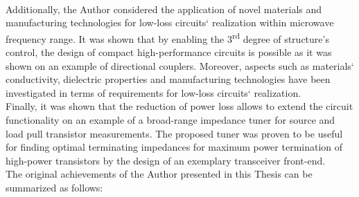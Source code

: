\\
\indent Additionally, the Author considered the application of novel materials and manufacturing technologies for low-loss circuits` realization within microwave frequency range. It was shown that by enabling the 3\textsuperscript{rd} degree of structure's control, the design of compact high-performance circuits is possible as it was shown on an example of directional couplers. Moreover, aspects such as materials` conductivity, dielectric properties and manufacturing technologies have been investigated in terms of requirements for low-loss circuits` realization.
\\
\indent Finally, it was shown that the reduction of power loss allows to extend the circuit functionality on an example of a broad-range impedance tuner for source and load pull transistor measurements. The proposed tuner was proven to be useful for finding optimal terminating impedances for maximum power termination of high-power transistors by the design of an exemplary transceiver front-end.
\\
\indent The original achievements of the Author presented in this Thesis can be summarized as follows:

